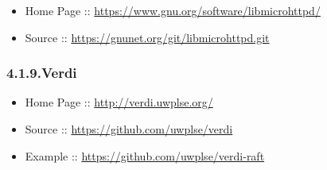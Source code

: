 \documentclass[12pt,twoside]{article}
\begin{document}
\begin{itemize}[noitemsep,topsep=\mdcompacttopsep]%

\item{}Home Page :: \href{https://www.gnu.org/software/libmicrohttpd/}{{\ttfamily https://\hspace{0pt}www.\hspace{0pt}gnu.\hspace{0pt}org/\hspace{0pt}software/\hspace{0pt}libmicrohttpd/\hspace{0pt}}}%

\item{}Source :: \href{https://gnunet.org/git/libmicrohttpd.git}{{\ttfamily https://\hspace{0pt}gnunet.\hspace{0pt}org/\hspace{0pt}git/\hspace{0pt}libmicrohttpd.\hspace{0pt}git}}%
\end{itemize}%

\subsubsection{4.1.9.\hspace*{0.5em}Verdi}\label{sec-verdi}%

\begin{itemize}[noitemsep,topsep=\mdcompacttopsep]%

\item{}Home Page :: \href{http://verdi.uwplse.org/}{{\ttfamily http://\hspace{0pt}verdi.\hspace{0pt}uwplse.\hspace{0pt}org/\hspace{0pt}}}%

\item{}Source :: \href{https://github.com/uwplse/verdi}{{\ttfamily https://\hspace{0pt}github.\hspace{0pt}com/\hspace{0pt}uwplse/\hspace{0pt}verdi}}%

\item{}Example :: \href{https://github.com/uwplse/verdi-raft}{{\ttfamily https://\hspace{0pt}github.\hspace{0pt}com/\hspace{0pt}uwplse/\hspace{0pt}verdi-\hspace{0pt}raft}}%
\end{itemize}%
\end{document}
